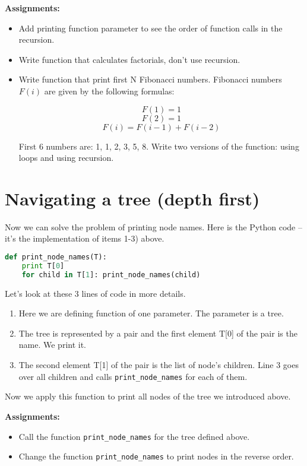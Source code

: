 \bigskip
\begin{tcolorbox}
\textbf{Assignments:}
\begin{itemize}
\item Add printing function parameter to see the order of function calls
in the recursion.
\item Write function that calculates factorials, don't use recursion.
\item Write function that print first N Fibonacci numbers. 
Fibonacci numbers $F(i)$ are given by the following
formulas:

$$F(1) = 1$$ $$F(2) = 1$$ $$F(i) = F(i-1) + F(i-2) $$

First 6 numbers are: 1, 1, 2, 3, 5, 8.
Write two versions of the function: using loops and using recursion.
\end{itemize}
\end{tcolorbox}


\section{Navigating a tree (depth first)}
Now we can solve the problem of printing node names.
Here is the Python code --
it's the implementation of items 1-3) above.

\begin{lstlisting}[style=codelst2,language=Python,caption={Python: printing node names (depth first)}]
def print_node_names(T):
    print T[0]
    for child in T[1]: print_node_names(child)
\end{lstlisting}

Let's look at these 3 lines of code in more details.

\begin{leftborder}
\begin{enumerate}
\item Here we are defining function of one parameter. The parameter is a tree.
\item The tree is represented by a pair and the first element T[0] of
the pair is the name. We print it.
\item The second element T[1] of the pair is the list of node's children. 
Line 3 goes over all children and calls
\lstinline{print_node_names} for each of them.
\end{enumerate}
\end{leftborder}

Now we apply this function to print all nodes of the tree we introduced above.
\bigskip
\begin{tcolorbox}
\textbf{Assignments:}
\begin{itemize}
\item Call the function \lstinline{print_node_names}
for the tree defined above. 
\item Change the function \lstinline{print_node_names}
to print nodes in the reverse order.
\end{itemize}
\end{tcolorbox}


